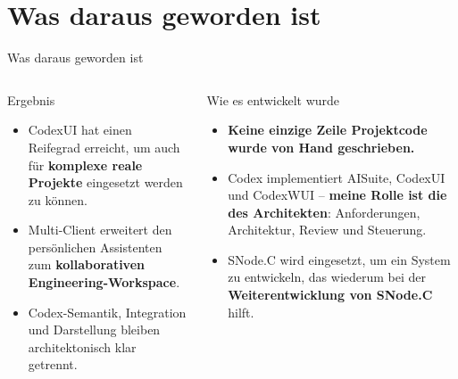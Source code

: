 \documentclass[\fhformat,10pt]{style/fh-ooe}
\begin{document}
\section{Was daraus geworden ist}
\begin{frame}{Was daraus geworden ist}
\centering
{}
\vspace{0.3em}
\small
\begin{columns}[T]
\begin{block}{Ergebnis}
\begin{itemize}
  \item CodexUI hat einen Reifegrad erreicht, um auch für \textbf{komplexe reale Projekte} eingesetzt werden zu können.
  \item Multi-Client erweitert den persönlichen Assistenten zum \textbf{kollaborativen Engineering-Workspace}.
  \item Codex-Semantik, Integration und Darstellung bleiben architektonisch klar getrennt.
\end{itemize}
\end{block}
\begin{block}{Wie es entwickelt wurde}
\begin{itemize}
  \item \textbf{Keine einzige Zeile Projektcode wurde von Hand geschrieben.}
  \item Codex implementiert AISuite, CodexUI und CodexWUI -- \textbf{meine Rolle ist die des Architekten}: Anforderungen, Architektur, Review und Steuerung.
  \item SNode.C wird eingesetzt, um ein System zu entwickeln, das wiederum bei der \textbf{Weiterentwicklung von SNode.C} hilft.
\end{itemize}
\end{block}
\end{columns}
\end{frame}
\end{document}
